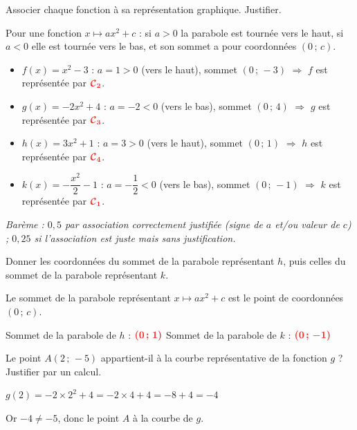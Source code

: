 \documentclass[11pt,a4paper]{article}  %
\begin{document}
	\begin{enumMet}
		\item Associer chaque fonction à sa représentation graphique. Justifier.

		\begin{corrBox}
			Pour une fonction $x\mapsto ax^2+c$ : si $a>0$ la parabole est tournée vers le haut, si $a<0$ elle est tournée vers le bas, et son sommet a pour coordonnées $(0\,;\,c)$.
			\begin{itemize}
				\item $f(x)=x^2-3$ : $a=1>0$ (vers le haut), sommet $(0\,;\,-3)$ $\Rightarrow$ $f$ est représentée par $\mRouge{\mathcal{C}_2}$. \quad {}
				\item $g(x)=-2x^2+4$ : $a=-2<0$ (vers le bas), sommet $(0\,;\,4)$ $\Rightarrow$ $g$ est représentée par $\mRouge{\mathcal{C}_3}$. \quad {}
				\item $h(x)=3x^2+1$ : $a=3>0$ (vers le haut), sommet $(0\,;\,1)$ $\Rightarrow$ $h$ est représentée par $\mRouge{\mathcal{C}_4}$. \quad {}
				\item $k(x)=-\dfrac{x^2}{2}-1$ : $a=-\dfrac{1}{2}<0$ (vers le bas), sommet $(0\,;\,-1)$ $\Rightarrow$ $k$ est représentée par $\mRouge{\mathcal{C}_1}$. \quad {}
			\end{itemize}
			\emph{Barème : $0{,}5$ par association correctement justifiée (signe de $a$ et/ou valeur de $c$) ; $0{,}25$ si l'association est juste mais sans justification.}
		\end{corrBox}

		\item {} Donner les coordonnées du sommet de la parabole représentant $h$, puis celles du sommet de la parabole représentant $k$.

		\begin{corrBox}
			Le sommet de la parabole représentant $x\mapsto ax^2+c$ est le point de coordonnées $(0\,;\,c)$.

			Sommet de la parabole de $h$ : $\mRouge{(0\,;\,1)}$ \quad {} \qquad Sommet de la parabole de $k$ : $\mRouge{(0\,;\,-1)}$ \quad \bareme{0,5}
		\end{corrBox}

		\item Le point $A(2\,;\,-5)$ appartient-il à la courbe représentative de la fonction $g$ ? Justifier par un calcul.

		\begin{corrBox}
			$g(2)=-2\times 2^2+4=-2\times 4+4=-8+4=-4$ \quad {}

			Or $-4\neq -5$, donc le point $A$  à la courbe de $g$. \quad \bareme{0,5}

		\end{corrBox}
	\end{enumMet}
\end{document}
